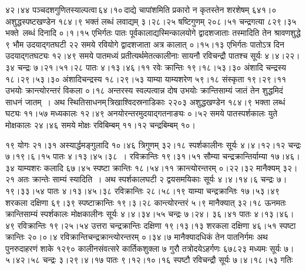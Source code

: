 \documentclass[11pt, openany]{book}
\begin{document}
\begin{sloppypar}
\noindent ४२।४४ पञ्चदशगुणितस्याल्पत्वा\textendash \,६४।१०\textendash \,दाद्ये चापांशमिति प्रकारो न कृतस्तेन शरशेषम् ६४१।० अशुद्धस्पष्टखण्डेन १८४।९ भक्तं लब्धं लवाद्यम् ३।२८।२५ षष्टिगुणम् २०८।५१ चन्द्रगत्या ८२९।३५ भक्ते~लब्धं दिनादि ०।१।१५ एभिर्गतः पातः पूर्वकालाद्यस्मिन्कालयोगे द्वादशजाताः तस्मादिति तेन श्रावणशुद्धे ९ भौम उदयाद्गतघटी २२ समये रवियोगे द्वादशजाता अत्र कालात् ०।१५।१३ एभिर्गतः पातोऽत्र दिन उदयाद्गतघट्यः १२।४९ समये पातमध्यं प्रतीत्यर्थमेतत्कालीनाः सायनौ रविचन्द्रौ पातश्च सूर्यः ४।४।२२।३४ चन्द्रः ७।२१।५१।२८ पातः ४।१३।४६।११ रवेः क्रान्तिः १९।१८।५३।३० अंशादि चन्द्रस्य १८।२९।५३।३० अंशादिचन्द्रस्य १८।२९।५३ याम्या याम्यशरेण ५९।१८ संस्कृता १९।२९।११ उभयोः क्रान्त्योरन्तरं विकला ०।१८ अन्तरस्य स्वल्पत्वान्न दोष उभयोः क्रान्तिसाम्यं जातं तेन शुद्धमिदं साधनं जातम्~। अथ स्थितिसाधनम्\textendash \,त्रिखाश्विदस्रनाडिकाः २२०३ अशुद्धखण्डेन १८४।९ भक्ता लब्धं घट्यः ११।५७ मध्यकालः १२।४९ अनयोरन्तरमुदयाद्गतनाङ्यः ०।५२ समये पातस्पर्शकालः युते मोक्षकालः २४।४६ समये मोक्षः रविबिम्बम् ११।१२ चन्द्रबिम्बम् १०।
\end{sloppypar}

\newpage

\begin{sloppypar}
\noindent १९ योगः २१।३१ अस्यार्द्धमङ्गुलादि १०।४६ त्रिगुणम् ३२।१८ स्पर्शकालीनः सूर्यः ४।४।१२।१२ चन्द्रः ७।१९।६।१५ पातः ४।१३।४५।३८~। रविक्रान्तिः १९।३१।५१ सौम्या चन्द्रक्रान्तिर्याम्या १७।४६।३४ याम्यशरः कलादि ६७।४५ स्पष्टा क्रान्तिः १८।५४।११ क्रान्त्योरन्तरम् ०।२२।३२ मानैक्यम् ३२।२१ अतः क्रान्तेः साम्यं स्यादिति~। अथ स्पर्शकालघटी २ द्वयसमयिकाः सूर्यः ४।४।१४।६ चन्द्रः ७।१९।३३।५४ पातः ४।१३।४५।३८ रविक्रान्तिः २८।५८।१९ याम्या चन्द्रक्रान्तिः १७।५३।४९ शरकला दक्षिणा ६९।३९ स्पष्टाक्रान्तिः १९।३।२८ कान्त्योरन्तरं ५।९ मानैक्यात् ३२।१८ ऊनमतः क्रान्तिसाम्यं स्पर्शकालः मोक्षकालीनः सूर्यः ४।४।३४।५५ चन्द्रः ७।२४। ३६।४१ पातः ४।१३।४६।४९ रविक्रान्तिः १९।२५।५४ उत्तरा चन्द्रक्रान्तिः दक्षिणा १९।१३।१३ शरकला दक्षिणा ४६।५१ स्पष्टा क्रान्तिः २०।०।४ रविक्रान्तिचन्द्रक्रान्त्योरन्तरम् ०।३४।७ मानैक्यादधिकं तेन पातनिर्गमः अथ पुनरुदाहरणं शाके १२९० कालीनसंवत्सरे कार्तिकशुक्ला ७ गुरौ तत्रोदयेऽहर्गणः ६७८२३ मध्यमः सूर्यः ७।५।४२।५८ चन्द्रः ३।२९।४।१७ पातः ९।१२।१०।१६ स्पष्टौ रविचन्द्रौ सूर्यः ७।४।१८।५३ गतिः
\end{sloppypar}

\newpage
\end{document}
